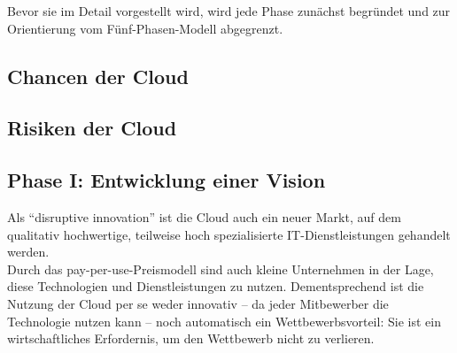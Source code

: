 Bevor sie im Detail vorgestellt wird, wird jede Phase zunächst begründet 
und zur Orientierung vom Fünf-Phasen-Modell abgegrenzt.
\begin{comment}
Das Fünf-Phasen-Modell beginnt mit einer technischen und 
wirtschaftlichen Machbarkeitsstudie. Die Migration einer On-Premise-Software in 
die Cloud bedeutet für das migrierende Unternehmen die Erschließung eines ganz 
neuen Marktes, der sich grundlegend vom bekannten Markt unterscheidet. Aus 
diesem Grund kann das Cloud-Produkt sich grundlegend vom bisherigen 
On-Premise-Produkt unterscheiden. Deshalb wird 
\citeflow{how_saas_changes_an_isvs_business} und 
\citeflow{towards_modelling_a_cloud_applications_life_cycle} eine zusätzliche 
Phase vorgeschlagen, in der eine Vision der künftigen Cloud-Lösung entworfen 
wird. Mit dieser Vision kann der Leistungsumfang abgeschätzt werden und auch, 
wie sich das Unternehmen verändern muss, um dieser Vision zu entsprechen. 
(Kapitel~\ref{cha:phaseI})\\
\end{comment}

\subsection{Chancen der Cloud}

\subsection{Risiken der Cloud}




\subsection{Phase I: Entwicklung einer Vision}
\label{cha:phaseI}

Als "`disruptive innovation"' ist die Cloud auch ein neuer Markt, auf dem 
qualitativ hochwertige, teilweise hoch spezialisierte IT-Dienstleistungen 
gehandelt werden. 
 \\
Durch das pay-per-use-Preismodell sind auch kleine Unternehmen in der Lage, 
diese Technologien und Dienstleistungen zu nutzen. 
 Dementsprechend ist die Nutzung der Cloud per se 
weder  innovativ -- da jeder Mitbewerber die Technologie nutzen kann -- noch 
automatisch ein Wettbewerbsvorteil: Sie ist ein wirtschaftliches Erfordernis, 
um den Wettbewerb nicht zu verlieren. 

